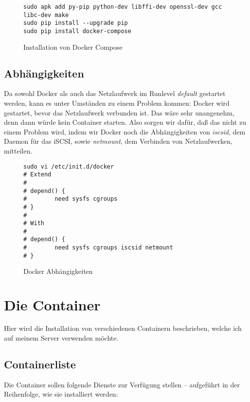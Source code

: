 \documentclass[12pt,a4paper]{article}
\newcommand{\code}[1]{\textit{#1}}
\begin{document}
\begin{figure}[H]
\begin{lstlisting}
sudo apk add py-pip python-dev libffi-dev openssl-dev gcc libc-dev make
sudo pip install --upgrade pip
sudo pip install docker-compose
\end{lstlisting}
\caption{Installation von Docker Compose}\label{fig:Installation von Docker Compose}
\end{figure}

\subsection{Abhängigkeiten}
Da sowohl Docker als auch das Netzlaufwerk im Runlevel \code{default} gestartet werden, kann es unter Umständen zu einem
Problem kommen: Docker wird gestartet, bevor das Netz\-laufwerk verbunden ist. Das wäre sehr unangenehm, denn dann würde
kein Container starten. Also sorgen wir dafür, daß das nicht zu einem Problem wird, indem wir Docker noch die
Abhängigkeiten von \code{iscsid}, dem Daemon für das iSCSI, sowie \code{netmount}, dem Verbinden von Netzlaufwerken,
mitteilen.

\begin{figure}[H]
\begin{lstlisting}
sudo vi /etc/init.d/docker
# Extend
#
# depend() {
#        need sysfs cgroups
# }
#
# With
#
# depend() {
#        need sysfs cgroups iscsid netmount
# }
\end{lstlisting}
\caption{Docker Abhängigkeiten}\label{fig:Docker Abhängigkeiten}
\end{figure}

\section{Die Container}
Hier wird die Installation von verschiedenen Containern beschrieben, welche ich auf meinem Server verwenden möchte.

\subsection{Containerliste}
Die Container sollen folgende Dienste zur Verfügung stellen -- aufgeführt in der Reihenfolge, wie sie installiert werden:
\end{document}
